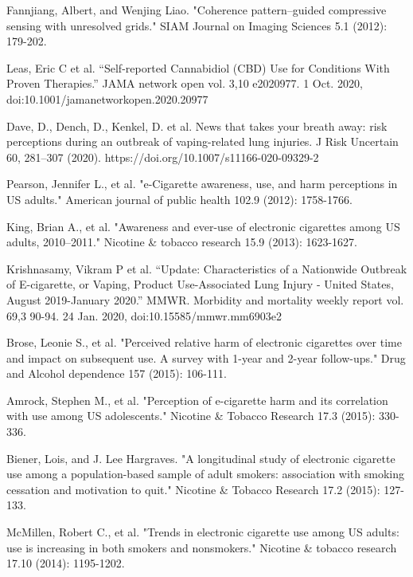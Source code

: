 \documentclass[12pt]{article}
\begin{document}
\newpage
\begin{thebibliography}{}
Fannjiang, Albert, and Wenjing Liao. "Coherence pattern–guided compressive sensing with unresolved grids." SIAM Journal on Imaging Sciences 5.1 (2012): 179-202.

Leas, Eric C et al. “Self-reported Cannabidiol (CBD) Use for Conditions With Proven Therapies.” JAMA network open vol. 3,10 e2020977. 1 Oct. 2020, doi:10.1001/jamanetworkopen.2020.20977


Dave, D., Dench, D., Kenkel, D. et al. News that takes your breath away: risk perceptions during an outbreak of vaping-related lung injuries. J Risk Uncertain 60, 281–307 (2020). https://doi.org/10.1007/s11166-020-09329-2

Pearson, Jennifer L., et al. "e-Cigarette awareness, use, and harm perceptions in US adults." American journal of public health 102.9 (2012): 1758-1766.

King, Brian A., et al. "Awareness and ever-use of electronic cigarettes among US adults, 2010–2011." Nicotine \& tobacco research 15.9 (2013): 1623-1627.

Krishnasamy, Vikram P et al. “Update: Characteristics of a Nationwide Outbreak of E-cigarette, or Vaping, Product Use-Associated Lung Injury - United States, August 2019-January 2020.” MMWR. Morbidity and mortality weekly report vol. 69,3 90-94. 24 Jan. 2020, doi:10.15585/mmwr.mm6903e2


Brose, Leonie S., et al. "Perceived relative harm of electronic cigarettes over time and impact on subsequent use. A survey with 1-year and 2-year follow-ups." Drug and Alcohol dependence 157 (2015): 106-111.

Amrock, Stephen M., et al. "Perception of e-cigarette harm and its correlation with use among US adolescents." Nicotine \& Tobacco Research 17.3 (2015): 330-336.

Biener, Lois, and J. Lee Hargraves. "A longitudinal study of electronic cigarette use among a population-based sample of adult smokers: association with smoking cessation and motivation to quit." Nicotine \& Tobacco Research 17.2 (2015): 127-133.

McMillen, Robert C., et al. "Trends in electronic cigarette use among US adults: use is increasing in both smokers and nonsmokers." Nicotine \& tobacco research 17.10 (2014): 1195-1202.


\end{thebibliography}
\end{document}
